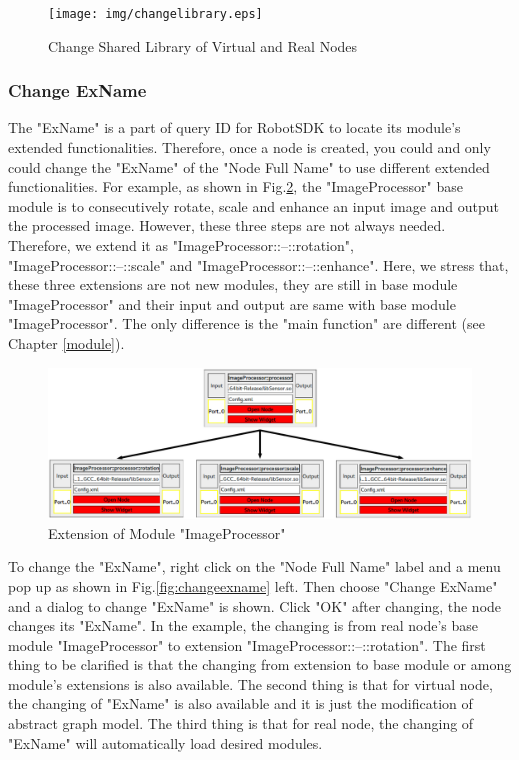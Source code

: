 \documentclass[a4paper,10pt]{book}
\begin{document}
\begin{figure}
 \centering
 \texttt{[image: img/changelibrary.eps]}
 \caption{Change Shared Library of Virtual and Real Nodes}
 \label{fig:changelibrary}
\end{figure}

\subsubsection{Change ExName}

The "ExName" is a part of query ID for RobotSDK to locate its module's extended functionalities. Therefore, once a node is created, you could and only could change the "ExName" of the "Node Full Name" to use different extended functionalities. For example, as shown in Fig.\ref{fig:exname}, the "ImageProcessor" base module is to consecutively rotate, scale and enhance an input image and output the processed image. However, these three steps are not always needed. Therefore, we extend it as "ImageProcessor::--::rotation", "ImageProcessor::--::scale" and "ImageProcessor::--::enhance". Here, we stress that, these three extensions are not new modules, they are still in base module "ImageProcessor" and their input and output are same with base module "ImageProcessor". The only difference is the "main function" are different (see Chapter \ref{module}).

\begin{figure}
 \centering
 \includegraphics[width=1.0\textwidth]{img/exname.eps}
 \caption{Extension of Module "ImageProcessor"}
 \label{fig:exname}
\end{figure}

To change the "ExName", right click on the "Node Full Name" label and a menu pop up as shown in Fig.\ref{fig:changeexname} left. Then choose "Change ExName" and a dialog to change "ExName" is shown. Click "OK" after changing, the node changes its "ExName". In the example, the changing is from real node's base module "ImageProcessor" to extension "ImageProcessor::--::rotation". The first thing to be clarified is that the changing from extension to base module or among module's extensions is also available. The second thing is that for virtual node, the changing of "ExName" is also available and it is just the modification of abstract graph model. The third thing is that for real node, the changing of "ExName" will automatically load desired modules.
\end{document}
